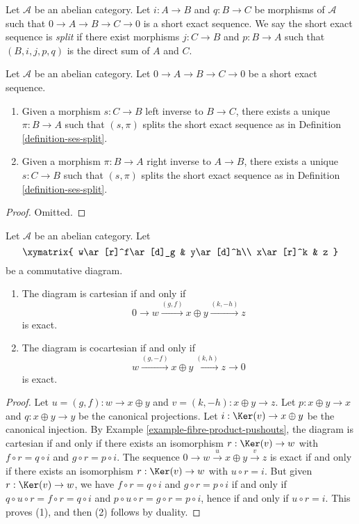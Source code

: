 \begin{definition}
\label{definition-ses-split}
Let $\mathcal{A}$ be an abelian category.
Let $i : A \to B$ and $q : B \to C$ be morphisms
of $\mathcal{A}$ such that
$0 \to A \to B \to C \to 0$ is a short
exact sequence. We say the short exact
sequence is {\it split} if there exist
morphisms $j : C \to B$ and $p : B \to A$ such
that $(B, i, j, p, q)$ is the direct sum of $A$ and $C$.
\end{definition}

\begin{lemma}
\label{lemma-ses-split}
Let $\mathcal{A}$ be an abelian category.
Let $0 \to A \to B \to C \to 0$
be a short exact sequence.
\begin{enumerate}
\item Given a morphism $s : C \to B$ left inverse to
$B \to C$, there exists a unique $\pi : B \to A$
such that $(s, \pi)$ splits the short exact sequence
as in Definition \ref{definition-ses-split}.
\item Given a morphism $\pi : B \to A$ right inverse to
$A \to B$, there exists a unique $s : C \to B$
such that $(s, \pi)$ splits the short exact sequence
as in Definition \ref{definition-ses-split}.
\end{enumerate}
\end{lemma}

\begin{proof}
Omitted.
\end{proof}

\begin{lemma}
\label{lemma-characterize-cartesian}
Let $\mathcal{A}$ be an abelian category. Let
$$
\xymatrix{
w\ar[r]^f\ar[d]_g
& y\ar[d]^h\\
x\ar[r]^k
& z
}
$$
be a commutative diagram. 
\begin{enumerate}
\item The diagram is cartesian if and only if 
$$
0 \to w \xrightarrow{(g, f)} x \oplus y \xrightarrow{(k, -h)} z
$$
is exact.
\item The diagram is cocartesian if and only if 
$$
w \xrightarrow{(g, -f)} x \oplus y \xrightarrow{(k, h)} z \to 0
$$
is exact.
\end{enumerate}
\end{lemma}

\begin{proof}
Let $u = (g, f) : w \to x \oplus y$ and $v = (k, -h) : x \oplus y \to z$. 
Let $p : x \oplus y \to x$ and $q : x \oplus y \to y$ be the canonical 
projections. Let $i : \Ker(v) \to x \oplus y$ be the canonical 
injection. By Example \ref{example-fibre-product-pushouts}, the diagram is 
cartesian if and only if there exists an isomorphism 
$r : \Ker(v) \to w$ with $f \circ r = q \circ i$ and 
$g \circ r = p \circ i$. The sequence 
$0 \to w \overset{u} \to x \oplus y \overset{v} \to z$ is exact if and 
only if there exists an isomorphism $r : \Ker(v) \to w$ with 
$u \circ r = i$. But given $r : \Ker(v) \to w$, we have 
$f \circ r = q \circ i$ and $g \circ r = p \circ i$ if and 
only if $q \circ u \circ r= f \circ r = q \circ i$ and 
$p \circ u \circ r = g \circ r = p \circ i$, hence if and only if
$u \circ r = i$. This proves (1), and then (2) follows by duality. 
\end{proof}

